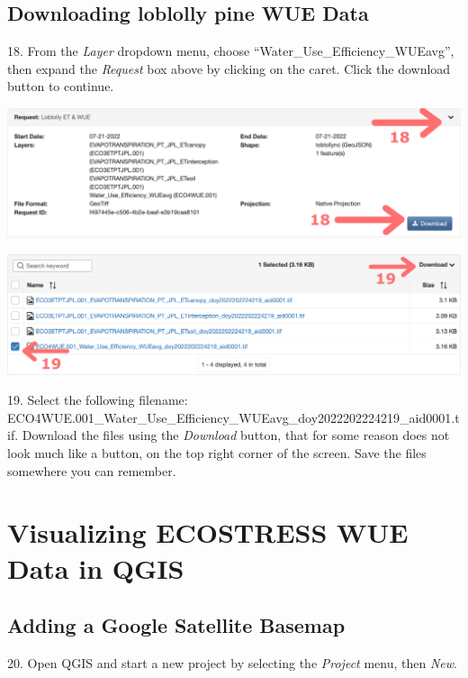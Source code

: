 \documentclass[oneside,a4paper,11pt,explicit]{book}
\begin{document}
\subsection{Downloading loblolly pine WUE Data}

18. From the \textit{Layer} dropdown menu, choose ``Water\_Use\_Efficiency\_WUEavg'', then expand the \textit{Request} box above by clicking on the caret. Click the download button to continue.

\vspace{.5em}

\centerline{\includegraphics[width=.6\textwidth]{RequestDownload.png}}

\vspace{.5em}

\vspace{.5em}

\centerline{\includegraphics[width=.6\textwidth]{WUEDownload.png}}

\vspace{.5em}

19. Select the following filename: ECO4WUE.001\_Water\_Use\_Efficiency\_WUEavg\_doy2022202224219\_aid0001.tif. Download the files using the \textit{Download} button, that for some reason does not look much like a button, on the top right corner of the screen. Save the files somewhere you can remember. 

\section{Visualizing ECOSTRESS WUE Data in QGIS}

\subsection{Adding a Google Satellite Basemap}

20. Open QGIS and start a new project by selecting the \textit{Project} menu, then \textit{New}.
\end{document}
